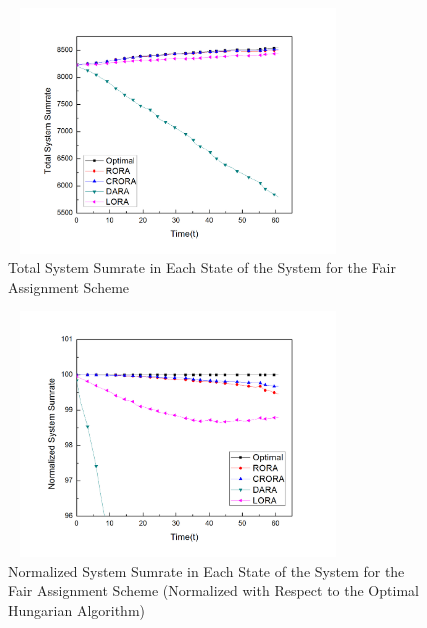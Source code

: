 \documentclass[times]{dacauth}
\begin{document}
\begin{figure}[t]
	{ %
		\setlength{\fboxsep}{1.5pt}%
		\setlength{\fboxrule}{1.5pt}%
		\centering
		\includegraphics[width=90mm,height=65mm]{Graph/sumrateFairJournal.jpg}
		\caption{Total System Sumrate in Each State of the System for the Fair Assignment Scheme }
		 \label{fig:sum_f}
	}
\end{figure}

\begin{figure}[t]
	{ %
		\setlength{\fboxsep}{1.5pt}%
		\setlength{\fboxrule}{1.5pt}%
		\centering
		\includegraphics[width=90mm,height=65mm]{Graph/NormalizedsumrateFairJournal.jpg}
		\caption{Normalized System Sumrate in Each State of the System for the Fair Assignment Scheme (Normalized with Respect to the Optimal Hungarian Algorithm)} \label{fig:sum_f_N}
	}
\end{figure}
\end{document}

